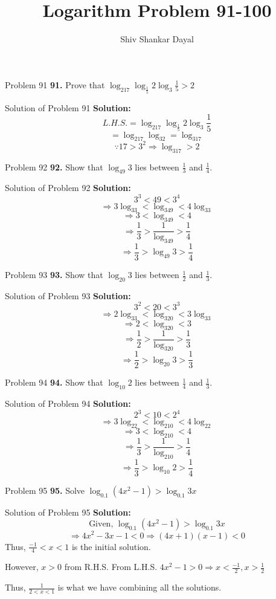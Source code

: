 \documentclass[aspectratio=1610,8pt]{beamer}
\title{Logarithm Problem 91-100}
\author[Shiv Shankar Dayal]{Shiv Shankar Dayal}
\begin{document}
\begin{frame}
  \titlepage
\end{frame}
\begin{frame}{Problem 91}
  \textbf{91.} Prove that $\log_217\log_{\frac{1}{5}}2\log_3\frac{1}{5} > 2$
\end{frame}
\begin{frame}{Solution of Problem 91}
  \textbf{Solution:} $$L.H.S. = \log_217\log_{\frac{1}{5}}2\log_3\frac{1}{5}$$
  $$= \log_217\log_32 = \log_317$$
  $$\because 17 > 3^2 \Rightarrow \log_317 > 2$$
\end{frame}
\begin{frame}{Problem 92}
  \textbf{92.} Show that $\log_{49}3$ lies between $\frac{1}{3}$ and $\frac{1}{4}.$
\end{frame}
\begin{frame}{Solution of Problem 92}
  \textbf{Solution:} $$3^3 < 49 < 3^4$$
  $$\Rightarrow 3\log_33 < \log_349 < 4\log_33$$
  $$\Rightarrow 3 < \log_349 < 4$$
  $$\Rightarrow \frac{1}{3} > \frac{1}{\log_349} > \frac{1}{4}$$
  $$\Rightarrow \frac{1}{3} > \log_{49}3 > \frac{1}{4}$$
\end{frame}
\begin{frame}{Problem 93}
  \textbf{93.} Show that $\log_{20}3$ lies between $\frac{1}{2}$ and $\frac{1}{3}.$
\end{frame}
\begin{frame}{Solution of Problem 93}
  \textbf{Solution:} $$3^2 < 20 < 3^3$$
  $$\Rightarrow 2\log_33 < \log_320 < 3\log_33$$
  $$\Rightarrow 2 < \log_320 < 3$$
  $$\Rightarrow \frac{1}{2} > \frac{1}{\log_320} > \frac{1}{3}$$
  $$\Rightarrow \frac{1}{2} > \log_{20}3 > \frac{1}{3}$$
\end{frame}
\begin{frame}{Problem 94}
  \textbf{94.} Show that $\log_{10}2$ lies between $\frac{1}{4}$ and $\frac{1}{3}.$
\end{frame}
\begin{frame}{Solution of Problem 94}
  \textbf{Solution:} $$2^3 < 10 < 2^4$$
  $$\Rightarrow 3\log_22 < \log_210 < 4\log_22$$
  $$\Rightarrow 3 < \log_210 < 4$$
  $$\Rightarrow \frac{1}{3} > \frac{1}{\log_210} > \frac{1}{4}$$
  $$\Rightarrow \frac{1}{3} > \log_{10}2 > \frac{1}{4}$$
\end{frame}
\begin{frame}{Problem 95}
  \textbf{95.} Solve $\log_{0.1}(4x^2 -1) > \log_{0.1}3x$
\end{frame}
\begin{frame}{Solution of Problem 95}
  \textbf{Solution:} $$\text{Given,~}\log_{0.1}(4x^2 -1) > \log_{0.1}3x$$
  $$\Rightarrow 4x^2 - 3x - 1 < 0 \Rightarrow (4x + 1)(x - 1) < 0$$
  Thus, $\frac{-1}{4}< x < 1$ is the initial solution.

  However, $x > 0$ from R.H.S. From L.H.S. $4x^2 - 1 > 0 \Rightarrow x < \frac{-1}{2}, x > \frac{1}{2}$

  Thus, $\frac{1}{2 < x < 1}$ is what we have combining all the solutions.
\end{frame}
\end{document}
